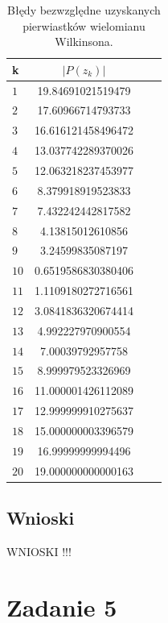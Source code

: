\documentclass{classrep}
\begin{document}
		
		\begin{table}[!h]
        	\centering
        	\footnotesize
		\begin{tabular}{l|S|S|S} \toprule
				{k} & {$|P(z_k)|$}\\ \midrule
				$1$ & 19.84691021519479 \\ 
	 			$2$ & 17.60966714793733 \\
	 			$3$ & 16.616121458496472 \\
	 			$4$ & 13.037742289370026 \\
	 			$5$ & 12.063218237453977 \\ 
	 			$6$ & 8.379918919523833 \\
	 			$7$ & 7.432242442817582 \\
	 			$8$ & 4.13815012610856 \\ 
	 			$9$ & 3.24599835087197 \\
	 			$10$ & 0.6519586830380406 \\
	 			$11$ & 1.1109180272716561 \\ 
	 			$12$ & 3.0841836320674414 \\
	 			$13$ & 4.992227970900554 \\ 
	 			$14$ & 7.00039792957758 \\
	 			$15$ & 8.999979523326969 \\
	 			$16$ & 11.000001426112089 \\ 
	 			$17$ & 12.999999910275637 \\
	 			$18$ & 15.000000003396579 \\ 
	 			$19$ & 16.99999999994496 \\
	 			$20$ & 19.000000000000163 \\ \bottomrule
	 		\end{tabular}
	 		\caption{Błędy bezwzględne uzyskanych pierwiastków wielomianu Wilkinsona.}
			\label{table:3}
		\end{table}	
		
	\subsection{Wnioski}
		WNIOSKI !!!
\section{Zadanie 5}
\end{document}
